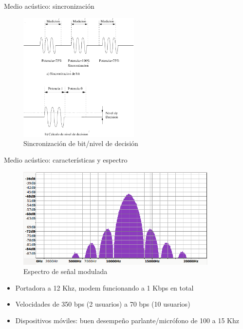 \documentclass[aspectratio=169]{beamer}
\begin{document}
\begin{frame}{Medio acústico: sincronización}

\begin{figure}[t]
  \centering  
    \includegraphics[width=6cm]{graphs/acusync}
    \\ Sincronización de bit/nivel de decisión
    \label{ios_process_mem}
\end{figure}

\end{frame}

\begin{frame}{Medio acústico: características y espectro}

\begin{figure}[t]
  \centering  
    \includegraphics[width=10cm]{graphs/spectrum.png}
    \\ Espectro de señal modulada
    \label{ios_process_mem}
\end{figure}

\begin{itemize}
 \item Portadora a 12 Khz, modem funcionando a 1 Kbps en total
 \item Velocidades de 350 bps (2 usuarios) a 70 bps (10 usuarios)
 \item Dispositivos móviles: buen desempeño parlante/micrófono de 100 a 15 Khz
\end{itemize}

\end{frame}
\end{document}
